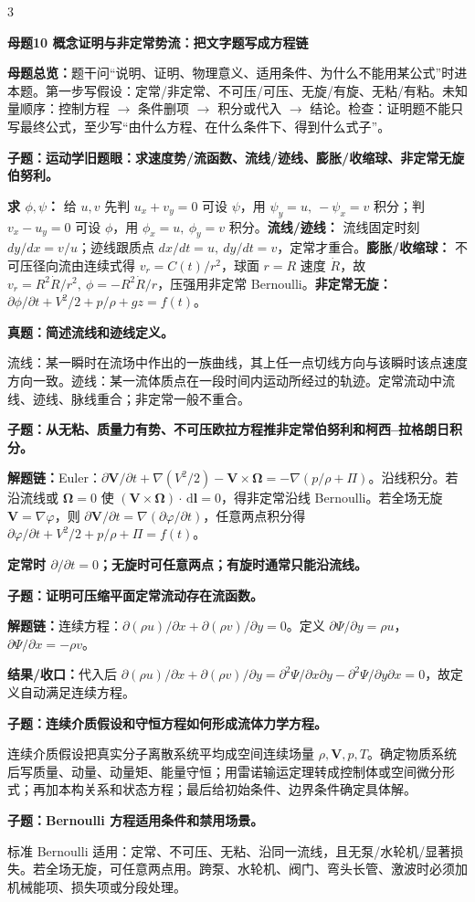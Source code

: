 \documentclass[a4paper]{article}
\newcommand{\mt}[1]{\vspace{0.45pt}\colorbox{M}{\parbox{\dimexpr\linewidth-2\fboxsep}{\color{white}\bfseries #1}}\par}
\newcommand{\qt}[1]{\vspace{0.25pt}\colorbox{Q}{\parbox{\dimexpr\linewidth-2\fboxsep}{\color{white}\bfseries #1}}\par}
\newcommand{\ans}[1]{\colorbox{G}{\parbox{\dimexpr\linewidth-2\fboxsep}{#1}}\par}
\newcommand{\warn}[1]{\colorbox{Y}{\parbox{\dimexpr\linewidth-2\fboxsep}{\color{E}\bfseries #1}}\par}
\newcommand{\chain}[1]{{\color{A}\bfseries 解题链：}#1\par}
\newcommand{\res}[1]{{\color{E}\bfseries 结果/收口：}#1\par}
\newcommand{\dd}{\,\mathrm d}
\newcommand{\mview}[1]{\ans{\textbf{母题总览：}#1}}
\begin{document}
\begin{multicols}{3}
\mt{母题10 概念证明与非定常势流：把文字题写成方程链}
\mview{题干问“说明、证明、物理意义、适用条件、为什么不能用某公式”时进本题。第一步写假设：定常/非定常、不可压/可压、无旋/有旋、无粘/有粘。未知量顺序：控制方程 $\to$ 条件删项 $\to$ 积分或代入 $\to$ 结论。检查：证明题不能只写最终公式，至少写“由什么方程、在什么条件下、得到什么式子”。}
\qt{子题：运动学旧题眼：求速度势/流函数、流线/迹线、膨胀/收缩球、非定常无旋伯努利。}
\ans{\textbf{求 $\phi,\psi$：} 给 $u,v$ 先判 $u_x+v_y=0$ 可设 $\psi$，用 $\psi_y=u,\ -\psi_x=v$ 积分；判 $v_x-u_y=0$ 可设 $\phi$，用 $\phi_x=u,\ \phi_y=v$ 积分。\textbf{流线/迹线：} 流线固定时刻 $dy/dx=v/u$；迹线跟质点 $dx/dt=u,\ dy/dt=v$，定常才重合。\textbf{膨胀/收缩球：} 不可压径向流由连续式得 $v_r=C(t)/r^2$，球面 $r=R$ 速度 $\dot R$，故 $v_r=R^2\dot R/r^2,\ \phi=-R^2\dot R/r$，压强用非定常 Bernoulli。\textbf{非定常无旋：} $\partial\phi/\partial t+V^2/2+p/\rho+gz=f(t)$。}
\qt{真题：简述流线和迹线定义。}
\ans{流线：某一瞬时在流场中作出的一族曲线，其上任一点切线方向与该瞬时该点速度方向一致。迹线：某一流体质点在一段时间内运动所经过的轨迹。定常流动中流线、迹线、脉线重合；非定常一般不重合。}

\qt{子题：从无粘、质量力有势、不可压欧拉方程推非定常伯努利和柯西--拉格朗日积分。}
\chain{Euler：$\partial\bm V/\partial t+\nabla(V^2/2)-\bm V\times\bm\Omega=-\nabla(p/\rho+\Pi)$。沿线积分。若沿流线或 $\bm\Omega=0$ 使 $(\bm V\times\bm\Omega)\cdot\dd\bm l=0$，得非定常沿线 Bernoulli。若全场无旋 $\bm V=\nabla\varphi$，则 $\partial\bm V/\partial t=\nabla(\partial\varphi/\partial t)$，任意两点积分得 $\partial\varphi/\partial t+V^2/2+p/\rho+\Pi=f(t)$。}
\warn{定常时 $\partial/\partial t=0$；无旋时可任意两点；有旋时通常只能沿流线。}

\qt{子题：证明可压缩平面定常流动存在流函数。}
\chain{连续方程：$\partial(\rho u)/\partial x+\partial(\rho v)/\partial y=0$。定义 $\partial\Psi/\partial y=\rho u$，$\partial\Psi/\partial x=-\rho v$。}
\res{代入后 $\partial(\rho u)/\partial x+\partial(\rho v)/\partial y=\partial^2\Psi/\partial x\partial y-\partial^2\Psi/\partial y\partial x=0$，故定义自动满足连续方程。}

\qt{子题：连续介质假设和守恒方程如何形成流体力学方程。}
\ans{连续介质假设把真实分子离散系统平均成空间连续场量 $\rho,\bm V,p,T$。确定物质系统后写质量、动量、动量矩、能量守恒；用雷诺输运定理转成控制体或空间微分形式；再加本构关系和状态方程；最后给初始条件、边界条件确定具体解。}

\qt{子题：Bernoulli 方程适用条件和禁用场景。}
\ans{标准 Bernoulli 适用：定常、不可压、无粘、沿同一流线，且无泵/水轮机/显著损失。若全场无旋，可任意两点用。跨泵、水轮机、阀门、弯头长管、激波时必须加机械能项、损失项或分段处理。}


\end{multicols}
\end{document}
